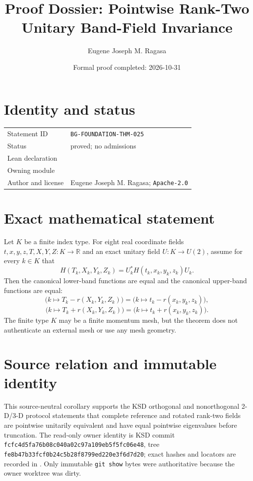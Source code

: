 \documentclass[10pt]{article}
\title{Proof Dossier: Pointwise Rank-Two Unitary Band-Field Invariance}
\author{Eugene Joseph M. Ragasa}
\date{Formal proof completed: 2026-10-31}
\begin{document}
\raggedright
\maketitle

\section{Identity and status}
\begin{tabularx}{\textwidth}{@{}lY@{}}
\toprule
Statement ID & \texttt{BG-FOUNDATION-THM-025} \\
Status & proved; no admissions \\
Lean declaration &  \\
Owning module &  \\
Author and license & Eugene Joseph M. Ragasa; \texttt{Apache-2.0} \\
\bottomrule
\end{tabularx}

\section{Exact mathematical statement}
Let $K$ be a finite index type. For eight real coordinate fields
$t,x,y,z,T,X,Y,Z:K\to\mathbb R$ and an exact unitary field
$U:K\to U(2)$, assume for every $k\in K$ that
\[
 H(T_k,X_k,Y_k,Z_k)=U_k^*H(t_k,x_k,y_k,z_k)U_k.
\]
Then the canonical lower-band functions are equal and the canonical upper-band functions are
equal:
\[
 \bigl(k\mapsto T_k-r(X_k,Y_k,Z_k)\bigr)
 =\bigl(k\mapsto t_k-r(x_k,y_k,z_k)\bigr),
\]
\[
 \bigl(k\mapsto T_k+r(X_k,Y_k,Z_k)\bigr)
 =\bigl(k\mapsto t_k+r(x_k,y_k,z_k)\bigr).
\]
The finite type $K$ may be a finite momentum mesh, but the theorem does not authenticate an
external mesh or use any mesh geometry.

\section{Source relation and immutable identity}
This source-neutral corollary supports the KSD orthogonal and nonorthogonal 2-D/3-D protocol
statements that complete reference and rotated rank-two fields are pointwise unitarily equivalent
and have equal pointwise eigenvalues before truncation. The read-only owner identity is KSD commit
\texttt{fcfc4d5fa76b08c040a02c97a109eb5f5fc06e48}, tree
\texttt{fe8b47b33fcf0b24c5b28f8799ed220e3f6d7d20}; exact hashes and locators are recorded in
. Only immutable \texttt{git show} bytes were authoritative because
the owner worktree was dirty.
\end{document}
